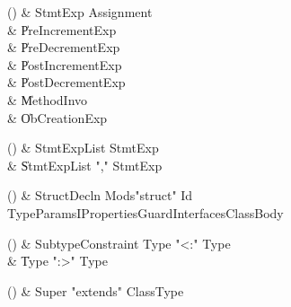 \begin{bbgrammarappendix}{4.3in}

() & StmtExp \label{prod:StmtExp}  \: Assignment  \\

 &    \| PreIncrementExp \\
 &    \| PreDecrementExp \\
 &    \| PostIncrementExp \\
 &    \| PostDecrementExp \\
 &    \| MethodInvo \\
 &    \| ObCreationExp \\

\end{bbgrammarappendix}

\begin{bbgrammarappendix}{3.9in}

() & StmtExpList \label{prod:StmtExpList}  \: StmtExp  \\

 &    \| StmtExpList \xcd"," StmtExp \\

\end{bbgrammarappendix}

\begin{bbgrammarappendix}{3.9in}

() & StructDecln \label{prod:StructDecln}  \: Mods\opt \xcd"struct" Id TypeParamsI\opt Properties\opt Guard\opt Interfaces\opt ClassBody  \\


\end{bbgrammarappendix}

\begin{bbgrammarappendix}{3.3in}

() & SubtypeConstraint \label{prod:SubtypeConstraint}  \: Type  \xcd"<:" Type   \\

 &    \| Type  \xcd":>" Type  \\

\end{bbgrammarappendix}

\begin{bbgrammarappendix}{4.5in}

() & Super \label{prod:Super}  \: \xcd"extends" ClassType  \\


\end{bbgrammarappendix}

